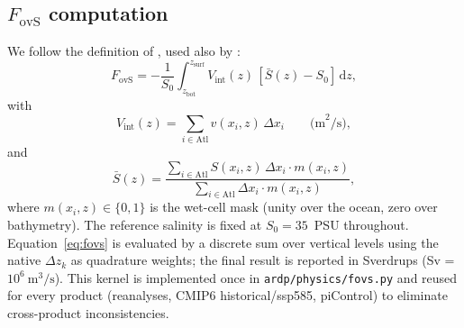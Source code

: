 \documentclass[12pt,a4paper]{article}
\newcommand{\Fovs}{F_\mathrm{ovS}}
\begin{document}
\subsection*{$\Fovs$ computation}

We follow the definition of \citet{deVriesWeber2005}, used also by
\citet{Dijkstra2007, Drijfhout2011, vanWesten2024}:
\begin{equation}
\Fovs = -\frac{1}{S_0}\int_{z_\mathrm{bot}}^{z_\mathrm{surf}}
  V_\mathrm{int}(z)\,[\bar{S}(z) - S_0]\,\mathrm{d}z,
\label{eq:fovs}
\end{equation}
with
\begin{equation}
V_\mathrm{int}(z) = \sum_{i\in\mathrm{Atl}} v(x_i, z)\,\Delta x_i
  \qquad\text{(m}^2/\mathrm{s)},
\end{equation}
and
\begin{equation}
\bar{S}(z) = \frac{\sum_{i\in\mathrm{Atl}} S(x_i, z)\,\Delta x_i
                  \cdot m(x_i, z)}
                 {\sum_{i\in\mathrm{Atl}} \Delta x_i \cdot m(x_i, z)},
\end{equation}
where $m(x_i, z)\in\{0, 1\}$ is the wet-cell mask (unity over the
ocean, zero over bathymetry). The reference salinity is fixed at
$S_0 = 35$~PSU throughout. Equation~\eqref{eq:fovs} is evaluated
by a discrete sum over vertical levels using the native
$\Delta z_k$ as quadrature weights; the final result is reported in
Sverdrups (Sv = $10^6~\mathrm{m}^3/\mathrm{s}$). This kernel is
implemented once in \texttt{ardp/physics/fovs.py} and reused for
every product (reanalyses, CMIP6 historical/ssp585, piControl) to
eliminate cross-product inconsistencies.
\end{document}
